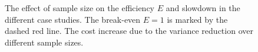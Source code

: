 \begin{figure}[htb]
	\myfloatalign
	\quad
	\caption[Effect of sample size on control variate performance]{
    The effect of sample size on the efficiency $E$ and slowdown in the different case studies.
    The break-even $E=1$ is marked by the dashed red line.
    The cost increase due to the variance reduction over different sample sizes.}
    \label{fig:sample_sizes}
\end{figure}

